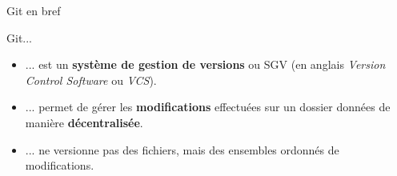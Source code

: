 \documentclass[svgnames,smaller]{beamer}
\renewcommand{\emph}[1]{\textbf{#1}}
\begin{document}
\begin{frame}{Git en bref}
\begin{minipage}{0.49\linewidth}
    Git...
    \begin{itemize}[<+->]
        \item ... est un \emph{système de gestion de versions} ou SGV (en anglais \textit{Version Control Software} ou \textit{VCS}).
        \item ... permet de gérer les \emph{modifications} effectuées sur un dossier données de manière \emph{décentralisée}.
        \item ... ne versionne pas des fichiers, mais des ensembles ordonnés de modifications.
    \end{itemize}
\end{minipage}
\begin{minipage}{0.49\linewidth}
\end{minipage}
\end{frame}
\end{document}
